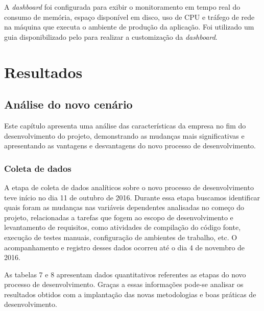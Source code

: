 \documentclass[
	12pt,				%
	openright,			%
	oneside,			%
	a4paper,			%
	english,			%
	french,				%
	spanish,			%
	brazil,				%
	]{abntex2}
\begin{document}
A \textit{dashboard} foi configurada para exibir o monitoramento em tempo real do consumo de memória, espaço disponível em disco, uso de CPU e tráfego de rede na máquina que executa o ambiente de produção da aplicação. Foi utilizado um guia disponibilizado pelo  para realizar a customização da \textit{dashboard}.





\part{Resultados}

\chapter{Análise do novo cenário}

Este capítulo apresenta uma análise das características da empresa no fim do desenvolvimento do projeto, demonstrando as mudanças mais significativas e apresentando as vantagens e desvantagens do novo processo de desenvolvimento.

\section{Coleta de dados}

A etapa de coleta de dados analíticos sobre o novo processo de desenvolvimento teve início no dia 11 de outubro de 2016. Durante essa etapa buscamos identificar quais foram as mudanças nas variáveis dependentes analisadas no começo do projeto, relacionadas a tarefas que fogem ao escopo de desenvolvimento e levantamento de requisitos, como atividades de compilação do código fonte, execução de testes manuais, configuração de ambientes de trabalho, etc. O acompanhamento e registro desses dados ocorreu até o dia 4 de novembro de 2016.

As tabelas 7 e 8 apresentam dados quantitativos referentes as etapas do novo processo de desenvolvimento. Graças a essas informações pode-se analisar os resultados obtidos com a implantação das novas metodologias e boas práticas de desenvolvimento.
\end{document}
